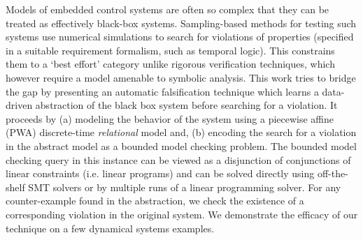 
Models of embedded control systems are often so complex that they can
be treated as effectively black-box systems. Sampling-based methods
for testing such systems use numerical simulations to search for
violations of properties (specified in a suitable requirement
formalism, such as temporal logic). This constrains them to a `best
effort' category unlike rigorous verification techniques, which
however require a model amenable to symbolic analysis. This work tries
to bridge the gap by presenting an automatic falsification technique
which learns a data-driven abstraction of the black box system before
searching for a violation. It proceeds by (a) modeling the behavior of
the system using a piecewise affine (PWA) discrete-time {\em
relational} model and, (b) encoding the search for a violation in the
abstract model as a bounded model checking problem. The bounded model
checking query in this instance can be viewed as a disjunction of
conjunctions of linear constraints (i.e. linear programs) and can be
solved directly using off-the-shelf SMT solvers or by multiple runs of
a linear programming solver. For any counter-example found in the
abstraction, we check the existence of a corresponding violation in
the original system. We demonstrate the efficacy of our technique on a
few dynamical systems examples.



